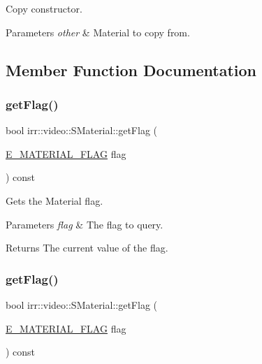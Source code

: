 Copy constructor. 


\begin{DoxyParams}{Parameters}
{\em other} & Material to copy from. \\
\hline
\end{DoxyParams}


\subsection{Member Function Documentation}
\mbox{\label{classirr_1_1video_1_1SMaterial_a3811e59a69983b4a7fce2d8e7aaf91f1}} 
\subsubsection{\texorpdfstring{get\+Flag()}{getFlag()}\hspace{0.1cm}{\footnotesize\ttfamily [1/2]}}
{\footnotesize\ttfamily bool irr\+::video\+::\+S\+Material\+::get\+Flag (\begin{DoxyParamCaption}\item[{\hyperlink{namespaceirr_1_1video_a8a3bc00ae8137535b9fbc5f40add70d3}{E\+\_\+\+M\+A\+T\+E\+R\+I\+A\+L\+\_\+\+F\+L\+AG}}]{flag }\end{DoxyParamCaption}) const\hspace{0.3cm}{\ttfamily [inline]}}



Gets the Material flag. 


\begin{DoxyParams}{Parameters}
{\em flag} & The flag to query. \\
\hline
\end{DoxyParams}
\begin{DoxyReturn}{Returns}
The current value of the flag. 
\end{DoxyReturn}
\mbox{\label{classirr_1_1video_1_1SMaterial_a3811e59a69983b4a7fce2d8e7aaf91f1}} 
\subsubsection{\texorpdfstring{get\+Flag()}{getFlag()}\hspace{0.1cm}{\footnotesize\ttfamily [2/2]}}
{\footnotesize\ttfamily bool irr\+::video\+::\+S\+Material\+::get\+Flag (\begin{DoxyParamCaption}\item[{\hyperlink{namespaceirr_1_1video_a8a3bc00ae8137535b9fbc5f40add70d3}{E\+\_\+\+M\+A\+T\+E\+R\+I\+A\+L\+\_\+\+F\+L\+AG}}]{flag }\end{DoxyParamCaption}) const\hspace{0.3cm}{\ttfamily [inline]}}



